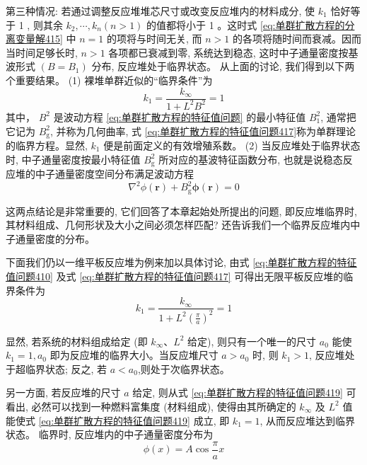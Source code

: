\documentclass{Sichuan Normal University}
\begin{document}
第三种情况: 若通过调整反应堆堆芯尺寸或改变反应堆内的材料成分, 使 $k_1$ 恰好等于 1 , 则其余 $k_2, \cdots, k_n(n>1)$ 的值都将小于 1 。这时式 \eqref{eq:单群扩散方程的分离变量解415} 中 $n=1$ 的项将与时间无关, 而 $n>1$ 的各项将随时间而衰减。因而当时间足够长时, $n>1$ 各项都已衰减到零, 系统达到稳态,
这时中子通量密度按基波形式 $\left(B=B_1\right)$ 分布, 反应堆处于临界状态。
从上面的讨论, 我们得到以下两个重要结果。
(1) 裸堆单群近似的“临界条件”为
\begin{equation}
k_1=\frac{k_{\infty}}{1+L^2 B^2}=1
\label{eq:单群扩散方程的特征值问题417}
\end{equation}
其中， $B^2$ 是波动方程 \eqref{eq:单群扩散方程的特征值问题} 的最小特征值 $B_1^2$, 通常把它记为 $B_{\mathrm{g}}^2$, 并称为几何曲率, 式 \eqref{eq:单群扩散方程的特征值问题417}称为单群理论的临界方程。显然, $k_1$ 便是前面定义的有效增殖系数。
(2) 当反应堆处于临界状态时, 中子通量密度按最小特征值 $B_{\mathrm{g}}^2$ 所对应的基波特征函数分布, 也就是说稳态反应堆的中子通量密度空间分布满足波动方程
\begin{equation}
\nabla^2 \phi(\boldsymbol{r})+B_{\mathrm{g}}^2 \boldsymbol{\phi}(\boldsymbol{r})=0
\label{eq:单群扩散方程的特征值问题418}
\end{equation}

这两点结论是非常重要的, 它们回答了本章起始处所提出的问题, 即反应堆临界时, 其材料组成、几何形状及大小之间必须怎样匹配? 还告诉我们一个临界反应堆内中子通量密度的分布。

下面我们仍以一维平板反应堆为例来加以具体讨论, 由式 \eqref{eq:单群扩散方程的特征值问题410} 及式 \eqref{eq:单群扩散方程的特征值问题417} 可得出无限平板反应堆的临界条件为
\begin{equation}
k_1=\frac{k_{\infty}}{1+L^2\left(\frac{\pi}{a}\right)^2}=1
\label{eq:单群扩散方程的特征值问题419}
\end{equation}

显然, 若系统的材料组成给定 (即 $k_{\infty} 、 L^2$ 给定), 则只有一个唯一的尺寸 $a_0$ 能使 $k_1=1, a_0$ 即为反应堆的临界大小。当反应堆尺寸 $a>a_0$ 时, 则 $k_1>1$, 反应堆处于超临界状态; 反之, 若 $a<a_0$,则处于次临界状态。

另一方面, 若反应堆的尺寸 $a$ 给定, 则从式 \eqref{eq:单群扩散方程的特征值问题419} 可看出, 必然可以找到一种燃料富集度 (材料组成), 使得由其所确定的 $k_{\infty}$ 及 $L^2$ 值能使式 \eqref{eq:单群扩散方程的特征值问题419} 成立, 即 $k_1=1$, 从而反应堆达到临界状态。
临界时, 反应堆内的中子通量密度分布为
\begin{equation}
\phi(x)=A \cos \frac{\pi}{a} x
\end{equation}
\end{document}
